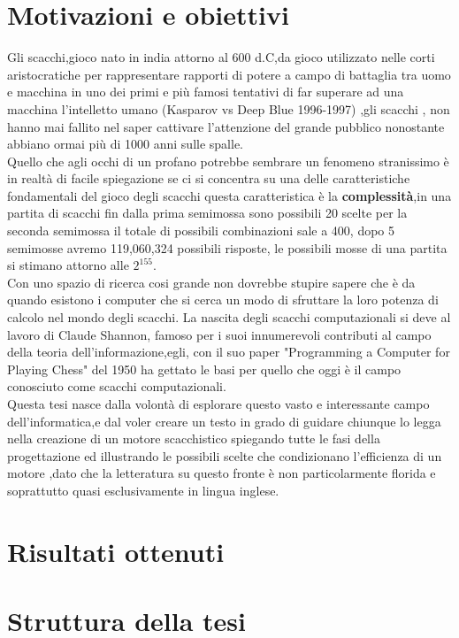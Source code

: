 \section{Motivazioni e obiettivi}
Gli scacchi,gioco nato in india attorno al 600 d.C,da gioco utilizzato nelle corti aristocratiche
 per rappresentare rapporti di potere a campo di battaglia tra uomo e macchina in uno dei primi e 
 più famosi tentativi di far superare ad una macchina l'intelletto umano (Kasparov vs Deep Blue 1996-1997)
,gli scacchi , non hanno mai  fallito nel saper cattivare  l'attenzione
 del grande pubblico nonostante abbiano ormai più di 1000 anni sulle spalle.
 \\Quello che agli occhi di un profano potrebbe sembrare un fenomeno  stranissimo
 è in realtà di facile spiegazione se ci si concentra su una delle caratteristiche fondamentali del 
 gioco degli scacchi  questa caratteristica è la \textbf{complessità},in una partita di scacchi fin dalla prima semimossa 
  sono possibili 20 scelte per la seconda semimossa il totale di possibili combinazioni  sale a 400,
 dopo 5 semimosse avremo 119,060,324 possibili risposte, le possibili mosse di una partita si stimano attorno alle \(2^{155} \).
 \\Con uno spazio di ricerca cosi grande non dovrebbe stupire sapere che è da quando esistono i computer che si cerca un modo
 di sfruttare la loro potenza di calcolo nel mondo degli scacchi.
 La nascita degli scacchi computazionali si deve al lavoro di Claude Shannon, famoso per i suoi innumerevoli contributi al 
 campo della teoria dell'informazione,egli, con il suo paper "Programming a Computer for Playing Chess" del 1950 ha gettato le
 basi per quello che oggi è il campo conosciuto come scacchi computazionali.
 \\Questa tesi nasce dalla volontà di esplorare questo vasto e interessante campo dell'informatica,e dal voler creare un testo
 in grado di guidare chiunque lo legga nella creazione di un motore scacchistico spiegando tutte le fasi della progettazione
 ed illustrando le possibili scelte che condizionano l'efficienza di un motore
 ,dato che la letteratura su questo fronte è  non particolarmente florida e soprattutto quasi esclusivamente in lingua inglese.




\section{Risultati ottenuti}

\section{Struttura della tesi}

